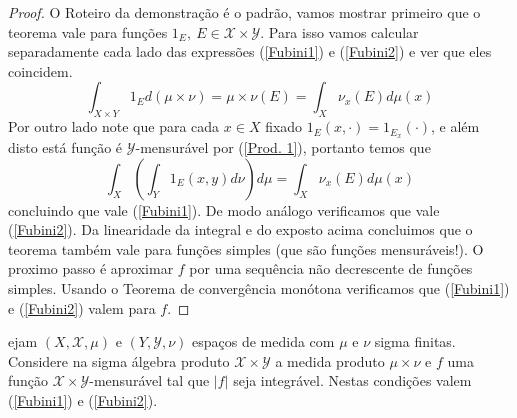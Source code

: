 \begin{proof}
O Roteiro da demonstração é o padrão, vamos mostrar primeiro que o teorema vale para funções $1_E,~E\in \mathscr{X}\times \mathscr{Y}$. Para isso vamos calcular separadamente cada lado das expressões (\ref{Fubini1}) e (\ref{Fubini2}) e ver que eles coincidem.
\begin{equation}
\int_{X\times Y} 1_E d(\mu\times \nu)=\mu\times \nu( E)=\int_X \nu_x(E) d\mu(x)
\end{equation}
Por outro lado note que para cada $x\in X$ fixado $1_E(x,\cdot)=1_{E_x}(\cdot)$, e além disto está função é $\mathscr{Y}$-mensurável por (\ref{Prod. 1}),  portanto temos que 
\begin{equation}
\int_X(\int_Y 1_E(x,y) d\nu)d\mu= \int_X \nu_x(E) d\mu(x)
\end{equation}
concluindo que vale (\ref{Fubini1}). De modo análogo verificamos que vale (\ref{Fubini2}). Da linearidade da integral e do exposto acima 
concluimos que o teorema também vale para funções simples (que são funções mensuráveis!). O proximo passo é aproximar $f$ por uma sequência
não decrescente de funções simples. Usando o Teorema de convergência monótona verificamos que  (\ref{Fubini1}) e (\ref{Fubini2}) valem para $f$.
\end{proof}




\begin{corolario}[Fubini]
ejam $(X, \mathscr{X}, \mu)$ e $(Y, \mathscr{Y}, \nu)$
 espaços de medida com $\mu$ e $\nu$ sigma finitas. Considere na sigma álgebra
 produto $\mathscr{X}\times \mathscr{Y}$ a medida produto $\mu\times \nu$ e $f$ uma função $\mathscr{X}\times \mathscr{Y}$-mensurável tal que 
 $|f|$ seja integrável.  Nestas condições valem (\ref{Fubini1}) e (\ref{Fubini2}). 
\end{corolario}